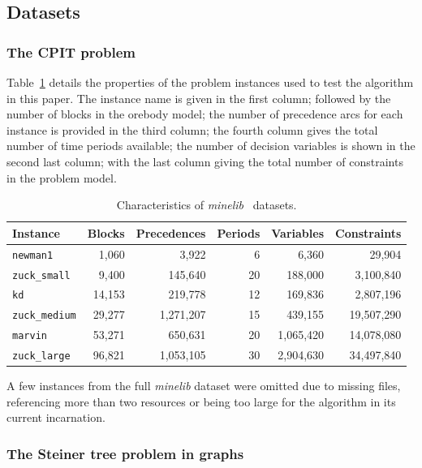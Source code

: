 \documentclass[journal]{IEEEtran}
\begin{document}
\subsection{Datasets}
\subsubsection*{The CPIT problem}
Table~\ref{tab:datasets} details the properties of the problem instances used to test the algorithm in this paper. The instance name is given in the first column; followed by the number of blocks in the orebody model; the number of precedence arcs for each instance is provided in the third column; the fourth column gives the total number of time periods available; the number of decision variables is shown in the second last column; with the last column giving the total number of constraints in the problem model.\par
%
\begin{table}[h!]
\centering
\caption{Characteristics of \emph{minelib}~\cite{minelib} datasets.}\label{tab:datasets}
\begin{adjustbox}{width=0.48\textwidth}
\begin{tabular}{lrrrrr} \toprule
Instance & Blocks & Precedences & Periods & Variables & Constraints\\
\hline
\texttt{newman1} & 1,060 & 3,922 & 6 & 6,360 & 29,904\\
\texttt{zuck\_small} & 9,400 & 145,640 & 20 & 188,000 & 3,100,840\\
\texttt{kd} & 14,153 & 219,778 & 12 & 169,836 & 2,807,196\\
\texttt{zuck\_medium} & 29,277 & 1,271,207 & 15 & 439,155 & 19,507,290\\
\texttt{marvin} & 53,271 & 650,631 & 20 & 1,065,420 & 14,078,080\\
\texttt{zuck\_large} & 96,821 & 1,053,105 & 30 & 2,904,630 & 34,497,840\\
\bottomrule
\end{tabular}
\end{adjustbox}
\end{table}
%
A few instances from the full \emph{minelib} dataset were omitted due to missing files, referencing more than two resources or being too large for the algorithm in its current incarnation.

\subsubsection*{The Steiner tree problem in graphs}
\end{document}
